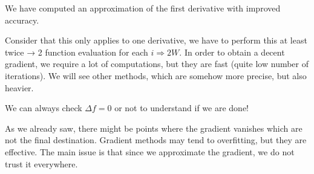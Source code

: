 We have computed an approximation of the first derivative with improved
accuracy.

Consider that this only applies to one derivative, we have to perform
this at least twice → 2 function evaluation for each $i \Rightarrow 2W$.
In order to obtain a decent gradient, we require a lot of computations,
but they are fast (quite low number of iterations). We will see other
methods, which are somehow more precise, but also heavier.

We can always check $\Delta f=0$ or not to understand if we are done!

As we already saw, there might be points where the gradient vanishes
which are not the final destination. Gradient methods may tend to
overfitting, but they are effective. The main issue is that since we
approximate the gradient, we do not trust it everywhere.
